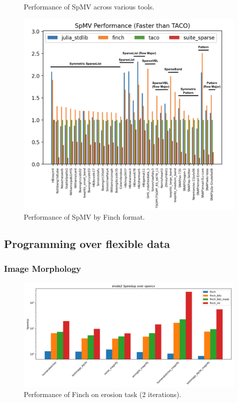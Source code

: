 \documentclass[acmsmall]{acmart}
\begin{document}
\begin{figure}
\begin{minipage}[t]{0.5\textwidth}
    \end{minipage}
    \caption{Performance of SpMV across various tools.}
\end{figure}

\begin{figure}
    \includegraphics[width=\linewidth]{spmv_performance_grouped.png}
    \caption{Performance of SpMV by Finch format.}
\end{figure}

\subsection{Programming over flexible data}

\subsubsection{Image Morphology}

\begin{figure}
	\includegraphics[width=\linewidth]{erode2_speedup_over_opencv.png}
    \caption{Performance of Finch on erosion task (2 iterations).}
\end{figure}
\end{document}
